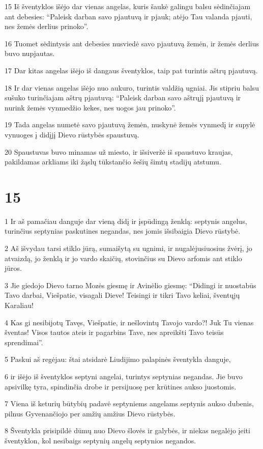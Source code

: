 \par 15 Iš šventyklos išėjo dar vienas angelas, kuris šaukė galingu balsu sėdinčiajam ant debesies: “Paleisk darban savo pjautuvą ir pjauk; atėjo Tau valanda pjauti, nes žemės derlius prinoko”. 
\par 16 Tuomet sėdintysis ant debesies nusviedė savo pjautuvą žemėn, ir žemės derlius buvo nupjautas. 
\par 17 Dar kitas angelas išėjo iš dangaus šventyklos, taip pat turintis aštrų pjautuvą. 
\par 18 Ir dar vienas angelas išėjo nuo aukuro, turintis valdžią ugniai. Jis stipriu balsu sušuko turinčiajam aštrų pjautuvą: “Paleisk darban savo aštrųjį pjautuvą ir nurink žemės vynmedžio kekes, nes uogos jau prinoko”. 
\par 19 Tada angelas numetė savo pjautuvą žemėn, nuskynė žemės vynmedį ir supylė vynuoges į didįjį Dievo rūstybės spaustuvą. 
\par 20 Spaustuvas buvo minamas už miesto, ir išsiveržė iš spaustuvo kraujas, pakildamas arkliams iki žąslų tūkstančio šešių šimtų stadijų atstumu.


\chapter{15}


\par 1 Ir aš pamačiau danguje dar vieną didį ir įspūdingą ženklą: septynis angelus, turinčius septynias paskutines negandas, nes jomis išsibaigia Dievo rūstybė. 
\par 2 Aš išvydau tarsi stiklo jūrą, sumaišytą su ugnimi, ir nugalėjusiuosius žvėrį, jo atvaizdą, jo ženklą ir jo vardo skaičių, stovinčius su Dievo arfomis ant stiklo jūros. 
\par 3 Jie giedojo Dievo tarno Mozės giesmę ir Avinėlio giesmę: “Didingi ir nuostabūs Tavo darbai, Viešpatie, visagali Dieve! Teisingi ir tikri Tavo keliai, šventųjų Karaliau! 
\par 4 Kas gi nesibijotų Tavęs, Viešpatie, ir nešlovintų Tavojo vardo?! Juk Tu vienas šventas! Visos tautos ateis ir pagarbins Tave, nes apreikšti Tavo teisūs sprendimai”. 
\par 5 Paskui aš regėjau: štai atsidarė Liudijimo palapinės šventykla danguje, 
\par 6 ir išėjo iš šventyklos septyni angelai, turintys septynias negandas. Jie buvo apsivilkę tyra, spindinčia drobe ir persijuosę per krūtines aukso juostomis. 
\par 7 Viena iš keturių būtybių padavė septyniems angelams septynis aukso dubenis, pilnus Gyvenančiojo per amžių amžius Dievo rūstybės. 
\par 8 Šventykla prisipildė dūmų nuo Dievo šlovės ir galybės, ir niekas negalėjo įeiti šventyklon, kol nesibaigs septynių angelų septynios negandos.


